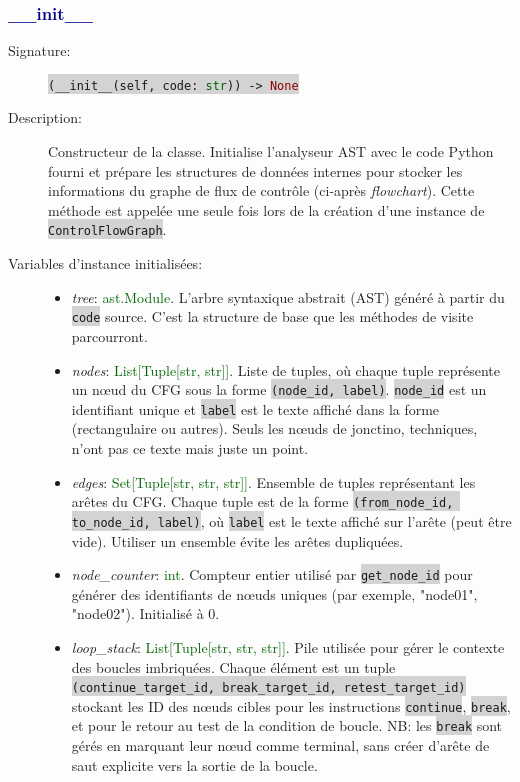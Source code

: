 \documentclass[11pt,a4paper]{article}
\newcommand{\code}[1]{\colorbox{lightgray}{\texttt{\small #1}}}
\newcommand{\var}[1]{\textit{#1}}
\newcommand{\vartype}[1]{\textcolor{darkgreen}{#1}}
\newcommand{\methodname}[1]{\textbf{\textcolor{darkblue}{#1}}}
\newcommand{\param}[1]{\code{#1}}
\newcommand{\rettype}[1]{\textcolor{darkred}{#1}}
\begin{document}
\subsubsection*{\methodname{\_\_init\_\_}}
\begin{description}
    \item[Signature:] \code{(\_\_init\_\_(self, code: \vartype{str})) -> \rettype{None}}
    \item[Description:] Constructeur de la classe. Initialise l'analyseur AST avec le code Python fourni et prépare les structures de données internes pour stocker les informations du graphe de flux de contrôle (ci-après \textit{flowchart}). Cette méthode est appelée une seule fois lors de la création d'une instance de \code{ControlFlowGraph}.
    \item[Variables d'instance initialisées:]
    \begin{itemize}
        \item \var{tree}: \vartype{ast.Module}. L'arbre syntaxique abstrait (AST) généré à partir du \param{code} source. C'est la structure de base que les méthodes de visite parcourront.
        
        \item \var{nodes}: \vartype{List[Tuple[str, str]]}. Liste de tuples, où chaque tuple représente un nœud du CFG sous la forme \code{(node\_id, label)}. \code{node\_id} est un identifiant unique et \code{label} est le texte affiché dans la forme (rectangulaire ou autres). Seuls les nœuds de jonctino, techniques, n'ont pas ce texte mais juste un point.
        
        \item \var{edges}: \vartype{Set[Tuple[str, str, str]]}. Ensemble de tuples représentant les arêtes du CFG. Chaque tuple est de la forme \code{(from\_node\_id, to\_node\_id, label)}, où \code{label} est le texte affiché sur l'arête (peut être vide). Utiliser un ensemble évite les arêtes dupliquées.
        
        \item \var{node\_counter}: \vartype{int}. Compteur entier utilisé par \code{get\_node\_id} pour générer des identifiants de nœuds uniques (par exemple, "node01", "node02"). Initialisé à 0.
        
        \item \var{loop\_stack}: \vartype{List[Tuple[str, str, str]]}. Pile utilisée pour gérer le contexte des boucles imbriquées. Chaque élément est un tuple \code{(continue\_target\_id, break\_target\_id, retest\_target\_id)} stockant les ID des nœuds cibles pour les instructions \code{continue}, \code{break}, et pour le retour au test de la condition de boucle. NB: les \code{break} sont gérés en marquant leur nœud comme terminal, sans créer d'arête de saut explicite vers la sortie de la boucle.
        

\end{itemize}
\end{description}
\end{document}
